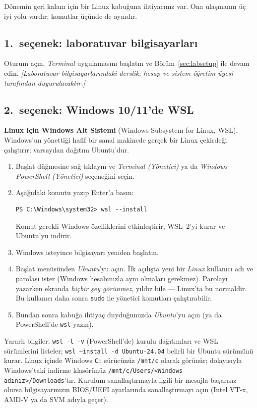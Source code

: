 \documentclass[11pt,a4paper]{article}
\newcommand{\term}[1]{\textbf{\color{mintdeep}#1}}
\newcommand{\cmd}[1]{\texttt{#1}}
\begin{document}
Dönemin geri kalanı için bir Linux kabuğuna ihtiyacınız var. Ona ulaşmanın üç iyi yolu vardır; komutlar üçünde de aynıdır.

\subsection{1.\ seçenek: laboratuvar bilgisayarları}
Oturum açın, \emph{Terminal} uygulamasını başlatın ve Bölüm~\ref{sec:labsetup} ile devam edin. \emph{[Laboratuvar bilgisayarlarındaki derslik, hesap ve sistem öğretim üyesi tarafından duyurulacaktır.]}

\subsection{2.\ seçenek: Windows 10/11'de WSL}
\term{Linux için Windows Alt Sistemi} (Windows Subsystem for Linux, WSL), Windows'un yönettiği hafif bir sanal makinede gerçek bir Linux çekirdeği çalıştırır; varsayılan dağıtım Ubuntu'dur.

\begin{enumerate}[leftmargin=1.4em]
  \item Başlat düğmesine sağ tıklayın ve \emph{Terminal (Yönetici)} ya da \emph{Windows PowerShell (Yönetici)} seçeneğini seçin.
  \item Aşağıdaki komutu yazıp Enter'a basın:
\begin{lstlisting}[style=term]
PS C:\Windows\system32> wsl --install
\end{lstlisting}
  Komut gerekli Windows özelliklerini etkinleştirir, WSL~2'yi kurar ve Ubuntu'yu indirir.
  \item Windows isteyince bilgisayarı yeniden başlatın.
  \item Başlat menüsünden \emph{Ubuntu}'yu açın. İlk açılışta yeni bir \emph{Linux} kullanıcı adı ve parolası ister (Windows hesabınızla aynı olmaları gerekmez). Parolayı yazarken ekranda \emph{hiçbir şey görünmez}, yıldız bile --- Linux'ta bu normaldir. Bu kullanıcı daha sonra \cmd{sudo} ile yönetici komutları çalıştırabilir.
  \item Bundan sonra kabuğa ihtiyaç duyduğunuzda \emph{Ubuntu}'yu açın (ya da PowerShell'de \cmd{wsl} yazın).
\end{enumerate}

Yararlı bilgiler: \cmd{wsl -l -v} (PowerShell'de) kurulu dağıtımları ve WSL sürümlerini listeler; \cmd{wsl --install -d Ubuntu-24.04} belirli bir Ubuntu sürümünü kurar. Linux içinde Windows \texttt{C:} sürücünüz \texttt{/mnt/c} olarak görünür; dolayısıyla Windows'taki indirme klasörünüz \texttt{/mnt/c/Users/<Windows adınız>/Downloads}'tır. Kurulum sanallaştırmayla ilgili bir mesajla başarısız olursa bilgisayarınızın BIOS/UEFI ayarlarında sanallaştırmayı açın (Intel VT-x, AMD-V ya da SVM adıyla geçer).
\end{document}
